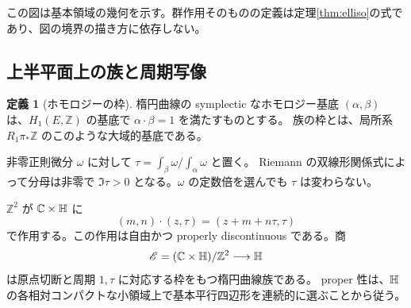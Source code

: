 \documentclass[dvipdfmx,a4paper,11pt]{article}
\theoremstyle{definition}
\newtheorem{dfn}[thm]{定義}
\newcommand{\C}{\mathbb C}\newcommand{\R}{\mathbb R}\newcommand{\Z}{\mathbb Z}\newcommand{\Q}{\mathbb Q}
\begin{document}
\par\medskip
\noindent\begin{minipage}{\linewidth}
\begin{center}
\end{center}
この図は基本領域の幾何を示す。群作用そのものの定義は定理\ref{thm:elliso}の式であり、図の境界の描き方に依存しない。
\end{minipage}\par\medskip

\subsection{上半平面上の族と周期写像}
\begin{dfn}[ホモロジーの枠]
楕円曲線の symplectic なホモロジー基底 $(\alpha,\beta)$ は、$H_1(E,\Z)$ の基底で $\alpha\cdot\beta=1$ を満たすものとする。
族の枠とは、局所系 $R_1\pi_*\Z$ のこのような大域的基底である。
\end{dfn}
非零正則微分 $\omega$ に対して $\tau=\int_\beta\omega/\int_\alpha\omega$ と置く。
Riemann の双線形関係式によって分母は非零で $\Im\tau>0$ となる。$\omega$ の定数倍を選んでも $\tau$ は変わらない。

$\Z^2$ が $\C\times\HH$ に
\[
(m,n)\cdot(z,\tau)=(z+m+n\tau,\tau)
\]
で作用する。この作用は自由かつ properly discontinuous である。商
\[
\mathscr E=(\C\times\HH)/\Z^2\longrightarrow\HH
\]
は原点切断と周期 $1,\tau$ に対応する枠をもつ楕円曲線族である。
proper 性は、$\mathbb H$ の各相対コンパクトな小領域上で基本平行四辺形を連続的に選ぶことから従う。
\end{document}
